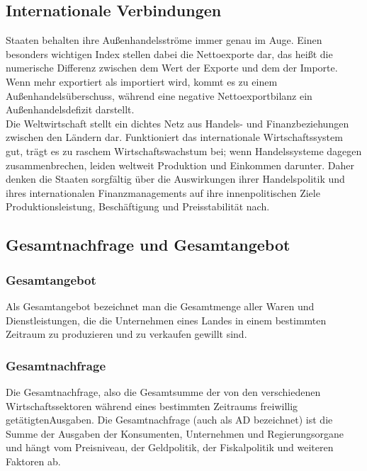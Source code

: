 \documentclass[10pt]{scrartcl}
\begin{document}
\subsection{Internationale Verbindungen}
Staaten behalten ihre Außenhandelsströme immer genau im Auge. Einen besonders wichtigen Index stellen dabei die Nettoexporte dar, das heißt die numerische Differenz zwischen dem Wert der Exporte und dem der Importe. Wenn mehr exportiert als importiert wird, kommt es zu einem Außenhandelsüberschuss, während eine negative Nettoexportbilanz ein Außenhandelsdefizit darstellt.\\
Die Weltwirtschaft stellt ein dichtes Netz aus Handels- und Finanzbeziehungen zwischen den Ländern dar. Funktioniert das internationale Wirtschaftssystem gut, trägt es zu raschem Wirtschaftswachstum bei; wenn Handelssysteme dagegen zusammenbrechen, leiden weltweit Produktion und Einkommen darunter. Daher denken die Staaten sorgfältig über die Auswirkungen ihrer Handelspolitik und ihres internationalen Finanzmanagements auf ihre innenpolitischen Ziele Produktionsleistung, Beschäftigung und Preisstabilität nach. 
\subsection{Gesamtnachfrage und Gesamtangebot}
\subsubsection{Gesamtangebot}
Als Gesamtangebot bezeichnet man die Gesamtmenge aller Waren und Dienstleistungen, die die Unternehmen eines Landes in einem bestimmten Zeitraum zu produzieren und zu verkaufen gewillt sind.
\subsubsection{Gesamtnachfrage}
Die Gesamtnachfrage, also die Gesamtsumme der von den verschiedenen Wirtschaftssektoren während eines bestimmten Zeitraums freiwillig getätigtenAusgaben. Die Gesamtnachfrage (auch als AD bezeichnet) ist die Summe der Ausgaben der Konsumenten, Unternehmen und Regierungsorgane und hängt vom Preisniveau, der Geldpolitik, der Fiskalpolitik und weiteren Faktoren ab.
\end{document}
